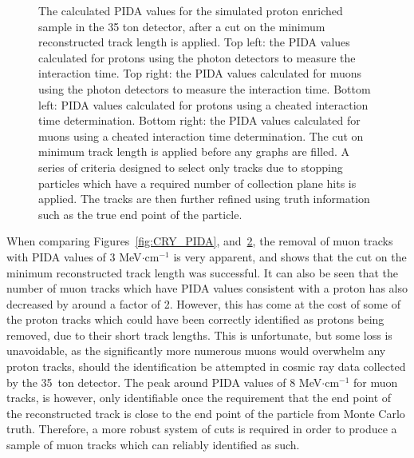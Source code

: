 \begin{figure}
\begin{subfigure}{0.48\textwidth}
        \label{fig:CRY_PIDACuts_Muon_Cheat}
  \end{subfigure}
  \caption[The calculated PIDA values for the simulated proton enriched sample in the 35 ton detector, after a cut on the minimum reconstructed track length is applied]
          {The calculated PIDA values for the simulated proton enriched sample in the 35 ton detector, after a cut on the minimum reconstructed track length is applied. Top left: the PIDA values calculated for protons using the photon detectors to measure the interaction time. Top right: the PIDA values calculated for muons using the photon detectors to measure the interaction time. Bottom left: PIDA values calculated for protons using a cheated interaction time determination. Bottom right: the PIDA values calculated for muons using a cheated interaction time determination. The cut on minimum track length is applied before any graphs are filled. A series of criteria designed to select only tracks due to stopping particles which have a required number of collection plane hits is applied. The tracks are then further refined using truth information such as the true end point of the particle.}
  \label{fig:CRY_PIDACuts}
\end{figure}

When comparing Figures~\ref{fig:CRY_PIDA}, and~\ref{fig:CRY_PIDACuts}, the removal of muon tracks with PIDA values of 3 MeV$\cdot$cm$^{-1}$ is very apparent, and shows that the cut on the minimum reconstructed track length was successful. It can also be seen that the number of muon tracks which have PIDA values consistent with a proton has also decreased by around a factor of 2. However, this has come at the cost of some of the proton tracks which could have been correctly identified as protons being removed, due to their short track lengths. This is unfortunate, but some loss is unavoidable, as the significantly more numerous muons would overwhelm any proton tracks, should the identification be attempted in cosmic ray data collected by the 35~ton detector. The peak around PIDA values of 8 MeV$\cdot$cm$^{-1}$ for muon tracks, is however, only identifiable once the requirement that the end point of the reconstructed track is close to the end point of the particle from Monte Carlo truth. Therefore, a more robust system of cuts is required in order to produce a sample of muon tracks which can reliably identified as such. \\


